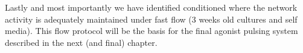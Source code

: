 Lastly and most importantly we have identified conditioned where the network activity is adequately maintained under fast flow (3 weeks old cultures and self media). This flow protocol will be the basis for the final agonist pulsing system described in the next (and final) chapter.


\label{sec:crossflow:conc} 